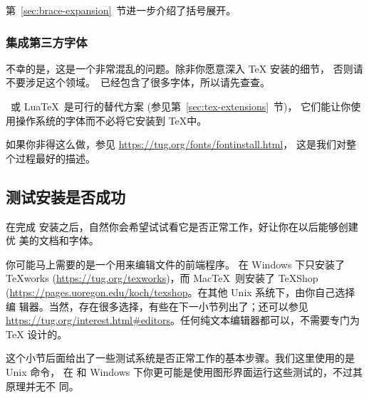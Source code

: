 \documentclass{article}
\begin{document}
第~\ref{sec:brace-expansion}~节进一步介绍了括号展开。

\subsubsection{集成第三方字体}

不幸的是，这是一个非常混乱的问题。除非你愿意深入 \TeX{} 安装的细节，
否则请不要涉足这个领域。\TL\ 已经包含了很多字体，所以请先查查。

\XeTeX\ 或 Lua\TeX\ 是可行的替代方案 (参见第~\ref{sec:tex-extensions}~节)，
它们能让你使用操作系统的字体而不必将它安装到 \TeX 中。

如果你非得这么做，参见 \url{https://tug.org/fonts/fontinstall.html}，
这是我们对整个过程最好的描述。

\subsection{测试安装是否成功}
\label{sec:test-install}

在完成 \TL{} 安装之后，自然你会希望试试看它是否正常工作，好让你在以后能够创建优
美的文档和字体。

你可能马上需要的是一个用来编辑文件的前端程序。\TL{} 在 Windows 下只安装了
\TeX{}works (\url{https://tug.org/texworks})，而 Mac\TeX\ 则安装了 TeXShop
(\url{https://pages.uoregon.edu/koch/texshop}。在其他 Unix 系统下，由你自己选择编
辑器。当然，存在很多选择，有些在下一小节列出了；还可以参见
\url{https://tug.org/interest.html#editors}。任何纯文本编辑器都可以，不需要专门为
\TeX{} 设计的。

这个小节后面给出了一些测试系统是否正常工作的基本步骤。我们这里使用的是 Unix 命令，
在 \MacOSX{} 和 Windows 下你更可能是使用图形界面运行这些测试的，不过其原理并无不
同。
\end{document}
